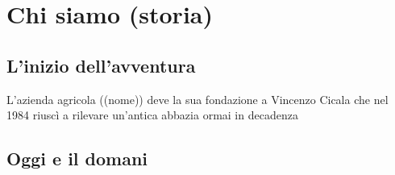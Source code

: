\section{Chi siamo (storia)}
\subsection{L'inizio dell'avventura}
L'azienda agricola ((nome)) deve la sua fondazione a Vincenzo Cicala che nel 1984 riuscì a rilevare un'antica abbazia ormai in decadenza 
\subsection{Oggi e il domani}
